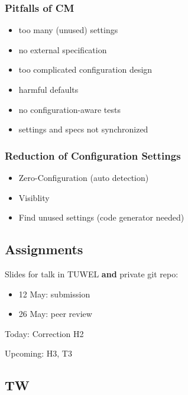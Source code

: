 \begin{frame}
	\frametitle{Pitfalls of CM}

	\pause

	\begin{itemize}
	\item too many (unused) settings
	\item no external specification
	\item too complicated configuration design
	\item harmful defaults
	\item no configuration-aware tests
	\item settings and specs not synchronized
	\end{itemize}
\end{frame}

\begin{frame}
	\frametitle{Reduction of Configuration Settings}

	\pause

	\begin{itemize}
	\item Zero-Configuration (auto detection)
	\item Visiblity
	\item Find unused settings (code generator needed)
	\end{itemize}
\end{frame}


\subsection{Assignments}

\begin{assignment}
	Slides for talk in TUWEL \textbf{and} private git repo:

	\begin{itemize}
	\item 12 May: submission
	\item 26 May: peer review
	\end{itemize}
\end{assignment}

\begin{assignment}
	Today: Correction H2

	Upcoming: H3, T3
\end{assignment}


\subsection{TW}

